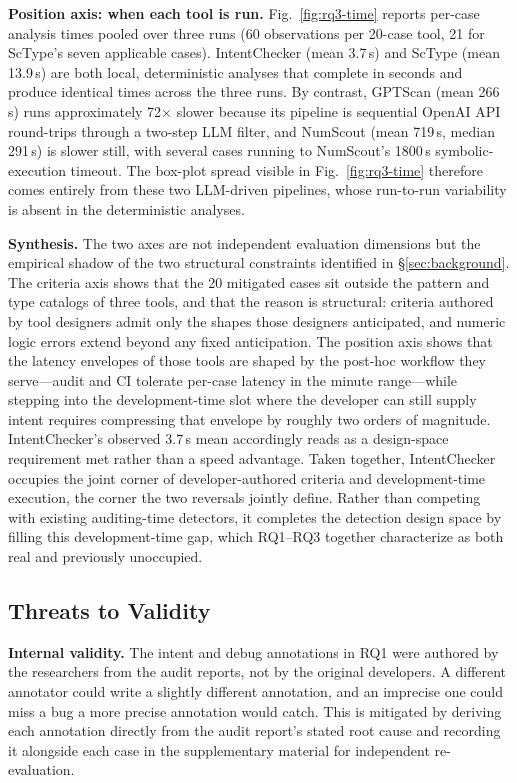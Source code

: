 \documentclass[pdflatex,sn-basic]{sn-jnl}%
\theoremstyle{thmstyleone}%
\theoremstyle{thmstyletwo}%
\theoremstyle{thmstylethree}%
\begin{document}
\smallskip
\noindent\textbf{Position axis: when each tool is run.}
Fig.~\ref{fig:rq3-time} reports per-case analysis times pooled over three runs (60 observations per 20-case tool, 21 for ScType's seven applicable cases).
IntentChecker (mean 3.7\,s) and ScType (mean 13.9\,s) are both local, deterministic analyses that complete in seconds and produce identical times across the three runs.
By contrast, GPTScan (mean 266\,s) runs approximately 72$\times$ slower because its pipeline is sequential OpenAI API round-trips through a two-step LLM filter, and NumScout (mean 719\,s, median 291\,s) is slower still, with several cases running to NumScout's 1800\,s symbolic-execution timeout.
The box-plot spread visible in Fig.~\ref{fig:rq3-time} therefore comes entirely from these two LLM-driven pipelines, whose run-to-run variability is absent in the deterministic analyses.

\smallskip
\noindent\textbf{Synthesis.}
The two axes are not independent evaluation dimensions but the empirical shadow of the two structural constraints identified in \S\ref{sec:background}.
The criteria axis shows that the 20 mitigated cases sit outside the pattern and type catalogs of three tools, and that the reason is structural: criteria authored by tool designers admit only the shapes those designers anticipated, and numeric logic errors extend beyond any fixed anticipation.
The position axis shows that the latency envelopes of those tools are shaped by the post-hoc workflow they serve---audit and CI tolerate per-case latency in the minute range---while stepping into the development-time slot where the developer can still supply intent requires compressing that envelope by roughly two orders of magnitude. IntentChecker's observed 3.7\,s mean accordingly reads as a design-space requirement met rather than a speed advantage.
Taken together, IntentChecker occupies the joint corner of developer-authored criteria and development-time execution, the corner the two reversals jointly define.
Rather than competing with existing auditing-time detectors, it completes the detection design space by filling this development-time gap, which RQ1--RQ3 together characterize as both real and previously unoccupied.

\subsection{Threats to Validity}\label{sec:threats}

\noindent\textbf{Internal validity.}
The intent and debug annotations in RQ1 were authored by the researchers from the audit reports, not by the original developers. A different annotator could write a slightly different annotation, and an imprecise one could miss a bug a more precise annotation would catch.
This is mitigated by deriving each annotation directly from the audit report's stated root cause and recording it alongside each case in the supplementary material for independent re-evaluation.
\end{document}
